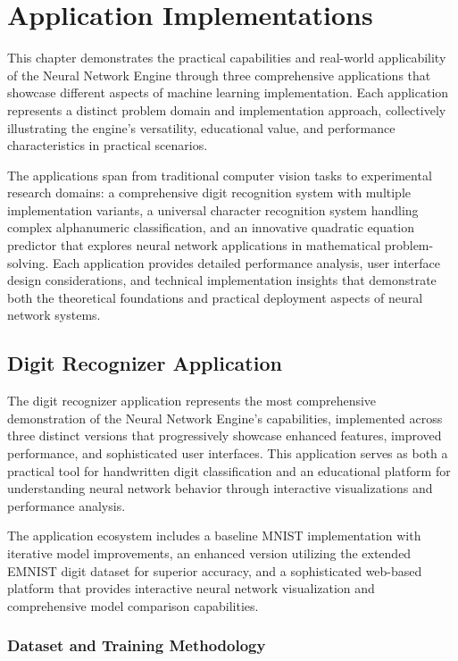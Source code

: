 \documentclass[11pt,a4paper]{report}
\begin{document}
\chapter{Application Implementations}

This chapter demonstrates the practical capabilities and real-world applicability of the Neural Network Engine through three comprehensive applications that showcase different aspects of machine learning implementation. Each application represents a distinct problem domain and implementation approach, collectively illustrating the engine's versatility, educational value, and performance characteristics in practical scenarios.

The applications span from traditional computer vision tasks to experimental research domains: a comprehensive digit recognition system with multiple implementation variants, a universal character recognition system handling complex alphanumeric classification, and an innovative quadratic equation predictor that explores neural network applications in mathematical problem-solving. Each application provides detailed performance analysis, user interface design considerations, and technical implementation insights that demonstrate both the theoretical foundations and practical deployment aspects of neural network systems.

\section{Digit Recognizer Application}

The digit recognizer application represents the most comprehensive demonstration of the Neural Network Engine's capabilities, implemented across three distinct versions that progressively showcase enhanced features, improved performance, and sophisticated user interfaces. This application serves as both a practical tool for handwritten digit classification and an educational platform for understanding neural network behavior through interactive visualizations and performance analysis.

The application ecosystem includes a baseline MNIST implementation with iterative model improvements, an enhanced version utilizing the extended EMNIST digit dataset for superior accuracy, and a sophisticated web-based platform that provides interactive neural network visualization and comprehensive model comparison capabilities.

\subsection{Dataset and Training Methodology}
\end{document}
